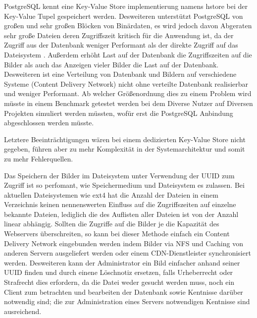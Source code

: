 PostgreSQL kennt eine Key-Value Store implementierung namens hstore
\cite{PostgreSQL-hstore} bei der Key-Value Tupel gespeichert werden. Desweiteren
unterstützt PostgreSQL von großen und sehr großen Blöcken von Binärdaten, es
wird jedoch davon Abgeraten sehr große Dateien deren Zugriffszeit kritisch für
die Anwendung ist, da der Zugriff aus der Datenbank weniger Performant als der
direkte Zugriff auf das Dateisystem \cite{PostgreSQL-blob}. Außerdem erhöht Last
auf der Datenbank die Zugriffszeiten auf die Bilder als auch das Anzeigen vieler
Bilder die Last auf der Datenbank. Desweiteren ist eine Verteilung von Datenbank
und Bildern auf verschiedene Systeme (Content Delivery Network) nicht ohne
verteilte Datenbank realisierbar und weniger Performant. Ab welcher
Größenordnung dies zu einem Problem wird müsste in einem Benchmark getestet
werden bei dem Diverse Nutzer auf Diversen Projekten simuliert werden müssten,
wofür erst die PostgreSQL Anbindung abgeschlossen werden müsste.

Letztere Beeinträchtigungen wären bei einem dedizierten Key-Value Store nicht
gegeben, führen aber zu mehr Komplexität in der Systemarchitektur und somit zu
mehr Fehlerquellen. 

Das Speichern der Bilder im Dateisystem unter Verwendung der UUID zum Zugriff
ist so perfomant, wie Speichermedium und Dateisystem es zulassen. Bei aktuellen
Dateisystemen wie ext4 hat die Anzahl der Dateien in einem Verzeichnis keinen
nennenswerten Einfluss auf die Zugriffszeiten auf einzelne bekannte Dateien,
lediglich die des Auflisten aller Dateien ist von der Anzahl linear abhängig.
Sollten die Zugriffe auf die Bilder je die Kapazität des Webservers
überschreiten, so kann bei dieser Methode einfach ein Content Delivery Network
eingebunden werden indem Bilder via NFS und Caching von anderen Servern
ausgeliefert werden oder einem CDN-Dienstleister synchronisiert werden.
Desweiteren kann der Administrator ein Bild einfacher anhand seiner UUID finden
und durch einene Löschnotiz ersetzen, falls Urheberrecht oder Strafrecht dies
erfordern, da die Datei weder gesucht werden muss, noch ein Client zum
betrachten und bearbeiten der Datenbank sowie Kentnisse darüber notwendig sind;
die zur Administration eines Servers notwendigen Kentnisse sind ausreichend.



